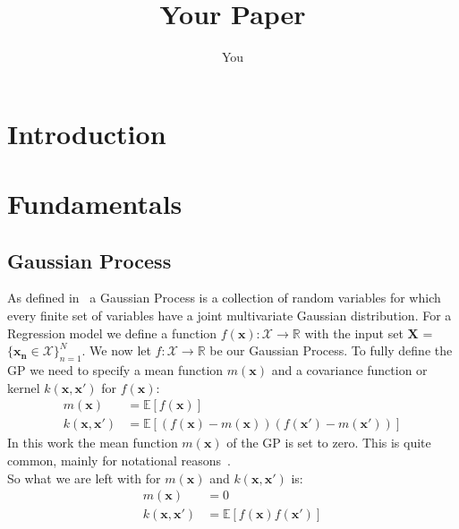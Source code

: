 \documentclass{article}
\title{Your Paper}
\author{You}
\begin{document}
\maketitle

\newpage
\begin{abstract}

\end{abstract}

\section{Introduction}

\section{Fundamentals}
\subsection{Gaussian Process} %
As defined in~\cite{RasmussenCarlEdward} a Gaussian Process is a collection of random variables for which every finite set of variables have a joint multivariate Gaussian distribution. For a Regression model we define a function $f(\bm{x}): \mathcal{X}\rightarrow \mathbb{R}$ with the input set ${\bm{X}}$ = $\{\bm{x_n} \in \mathcal{X} \}_{n=1}^N$. We now let $f: \mathcal{X}\rightarrow \mathbb{R}$ be our Gaussian Process.
To fully define the GP we need to specify a mean function $m(\bm{x})$ and a covariance function or kernel $k(\bm{x},\bm{x'})$ for $f(\bm{x})$:
\begin{equation}
\begin{aligned}
    m(\bm{x}) &= \mathbb{E}[f(\bm{x})]\\
    k(\bm{x},\bm{x'}) &= \mathbb{E}[(f(\bm{x})-m(\bm{x}))(f(\bm{x'})-m(\bm{x'}))]
\end{aligned}
\end{equation}
In this work the mean function $m(\bm{x})$ of the GP is set to zero. This is quite common, mainly for notational reasons~\cite{RasmussenCarlEdward}.\\
So what we are left with for  $m(\bm{x})$ and $ k(\bm{x},\bm{x'})$ is:
\begin{equation}
    \begin{aligned}
        m(\bm{x}) &= 0\\
        k(\bm{x},\bm{x'}) &= \mathbb{E}[f(\bm{x})f(\bm{x'})]
    \end{aligned}
    \end{equation}
\end{document}
